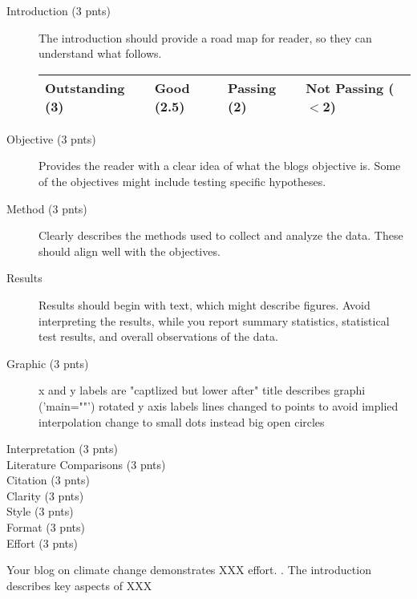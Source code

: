 \documentclass{article}\usepackage[]{graphicx}\usepackage[]{color}
\begin{document}
\begin{description}

\item[Introduction (3 pnts)] The introduction should provide a road map for reader, so they can understand what follows.

\begin{tabular}{llll}\hline
Outstanding (3)  & Good (2.5)  & Passing (2)  & Not Passing ($<$2)\\ \hline\hline


\end{tabular}

\item[Objective (3 pnts)] Provides the reader with a clear idea of what the blogs objective is. Some of the objectives might include testing specific hypotheses.

\item[Method (3 pnts)] Clearly describes the methods used to collect and analyze the data. These should align well with the objectives.

\item[Results] Results should begin with text, which might describe figures. Avoid interpreting the results, while you report summary statistics, statistical test results, and overall observations of the data.

\item[Graphic (3 pnts)]

x and y labels are "captlized but lower after"
title describes graphi ('main=""')
rotated y axis labels
lines changed to points to avoid implied interpolation
change to small dots instead big open circles


\item[Interpretation (3 pnts)]

\item[Literature Comparisons (3 pnts)]

\item[Citation (3 pnts)]

\item[Clarity (3 pnts)]

\item[Style (3 pnts)]

\item[Format (3 pnts)]

\item[Effort (3 pnts)]

\end{description}

Your blog on climate change demonstrates XXX effort. 
.
The introduction describes key aspects of XXX
\end{document}
